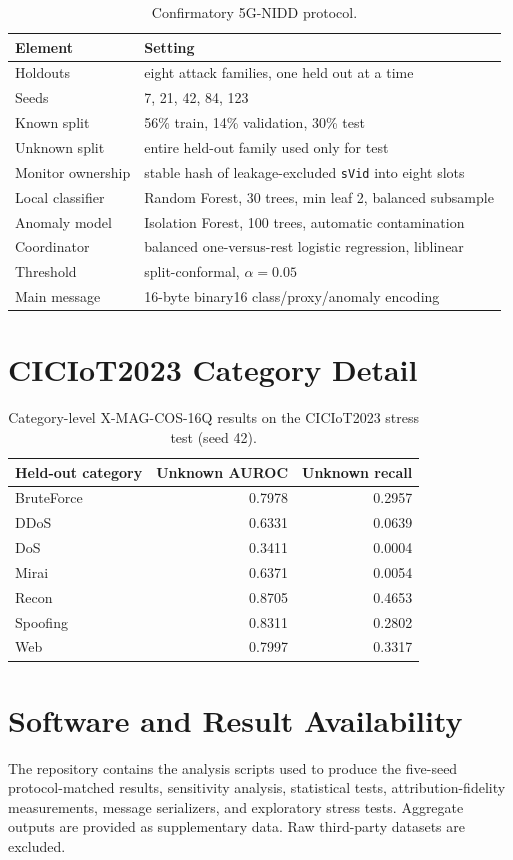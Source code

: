 \begin{table}[H]
\caption{Confirmatory 5G-NIDD protocol.}
\centering
\begin{tabular}{ll}
\toprule
Element & Setting \\
\midrule
Holdouts & eight attack families, one held out at a time \\
Seeds & 7, 21, 42, 84, 123 \\
Known split & 56\% train, 14\% validation, 30\% test \\
Unknown split & entire held-out family used only for test \\
Monitor ownership & stable hash of leakage-excluded \texttt{sVid} into eight slots \\
Local classifier & Random Forest, 30 trees, min leaf 2, balanced subsample \\
Anomaly model & Isolation Forest, 100 trees, automatic contamination \\
Coordinator & balanced one-versus-rest logistic regression, liblinear \\
Threshold & split-conformal, $\alpha=0.05$ \\
Main message & 16-byte binary16 class/proxy/anomaly encoding \\
\bottomrule
\end{tabular}
\end{table}

\section{CICIoT2023 Category Detail}

\begin{table}[H]
\caption{Category-level X-MAG-COS-16Q results on the CICIoT2023 stress test (seed 42).}
\centering
\begin{tabular}{lrr}
\toprule
Held-out category & Unknown AUROC & Unknown recall \\
\midrule
BruteForce & 0.7978 & 0.2957 \\
DDoS & 0.6331 & 0.0639 \\
DoS & 0.3411 & 0.0004 \\
Mirai & 0.6371 & 0.0054 \\
Recon & 0.8705 & 0.4653 \\
Spoofing & 0.8311 & 0.2802 \\
Web & 0.7997 & 0.3317 \\
\bottomrule
\end{tabular}
\end{table}

\section{Software and Result Availability}

The repository contains the analysis scripts used to produce the five-seed protocol-matched results, sensitivity analysis, statistical tests, attribution-fidelity measurements, message serializers, and exploratory stress tests. Aggregate outputs are provided as supplementary data. Raw third-party datasets are excluded.

